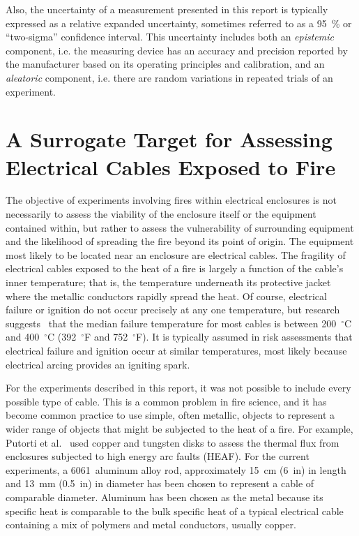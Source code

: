 Also, the uncertainty of a measurement presented in this report is typically expressed as a relative expanded uncertainty, sometimes referred to as a 95~\% or ``two-sigma'' confidence interval. This uncertainty includes both an {\em epistemic} component, i.e. the measuring device has an accuracy and precision reported by the manufacturer based on its operating principles and calibration, and an {\em aleatoric} component, i.e. there are random variations in repeated trials of an experiment.

\clearpage

\section{A Surrogate Target for Assessing Electrical Cables Exposed to Fire}
\label{cable_surrogate}

The objective of experiments involving fires within electrical enclosures is not necessarily to assess the viability of the enclosure itself or the equipment contained within, but rather to assess the vulnerability of surrounding equipment and the likelihood of spreading the fire beyond its point of origin. The equipment most likely to be located near an enclosure are electrical cables. The fragility of electrical cables exposed to the heat of a fire is largely a function of the cable's inner temperature; that is, the temperature underneath its protective jacket where the metallic conductors rapidly spread the heat. Of course, electrical failure or ignition do not occur precisely at any one temperature, but research suggests~\cite{CAROLFIRE} that the median failure temperature for most cables is between 200~$^\circ$C and 400~$^\circ$C (392~$^\circ$F and 752~$^\circ$F). It is typically assumed in risk assessments that electrical failure and ignition occur at similar temperatures, most likely because electrical arcing provides an igniting spark.

For the experiments described in this report, it was not possible to include every possible type of cable. This is a common problem in fire science, and it has become common practice to use simple, often metallic, objects to represent a wider range of objects that might be subjected to the heat of a fire. For example, Putorti et al.~\cite{Putorti:SMIRT23} used copper and tungsten disks to assess the thermal flux from enclosures subjected to high energy arc faults (HEAF). For the current experiments, a 6061~aluminum alloy rod, approximately  15~cm (6~in) in length and 13~mm (0.5~in) in diameter has been chosen to represent a cable of comparable diameter. Aluminum has been chosen as the metal because its specific heat is comparable to the bulk specific heat of a typical electrical cable containing a mix of polymers and metal conductors, usually copper.

